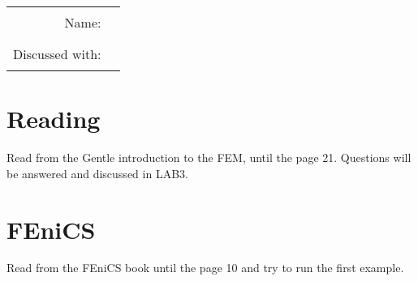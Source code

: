 \documentclass[unicode,11pt,a4paper,oneside,numbers=endperiod,openany]{scrartcl}
\begin{document}
\setassignment
{}
\newline


\begin{center}
\begin{tabular}{rc}
Name: 		    & \rule{5cm}{0.0pt} \\
Discussed with: & \rule{5cm}{0.0pt} 
\end{tabular}
\end{center}



\section{Reading}
Read from the Gentle introduction to the FEM, until the page 21.
Questions will be answered and discussed in LAB3.

\section{FEniCS}
Read from the FEniCS book until the page 10 and try to run the first example.
\end{document}
